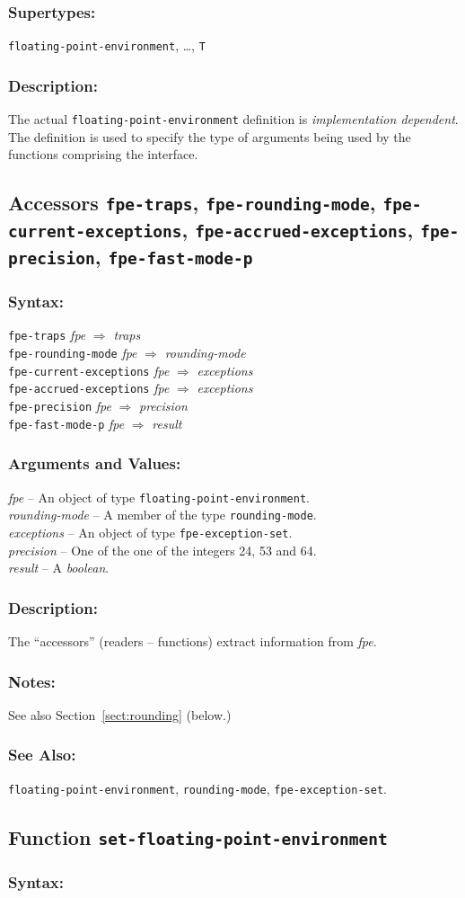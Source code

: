 \documentclass[10pt,fleqn]{article}
\newcommand{\code}[1]{\texttt{#1}}
\newcommand{\varname}[1]{\textit{#1}}
\newcommand{\DDictionaryItem}[1]{\vspace*{6pt}\noindent\hrulefill\vspace*{-9pt}\subsection*{#1}}
\newcommand{\DSyntax}{\subsubsection*{Syntax:}}
\newcommand{\DSupertypes}{\subsubsection*{Supertypes:}}
\newcommand{\DArgsNValues}{\subsubsection*{Arguments and Values:}}
\newcommand{\DDescription}{\subsubsection*{Description:}}
\newcommand{\DNotes}{\subsubsection*{Notes:}}
\newcommand{\DSeeAlso}{\subsubsection*{See Also:}}
\begin{document}
\DSupertypes{}

\code{floating-point-environment}, \ldots, \code{T}

\DDescription{}

The actual \code{floating-point-environment} definition is
\emph{implementation dependent}.  The definition is used to specify
the type of arguments being used by the functions comprising the
interface.


\DDictionaryItem{Accessors \code{fpe-traps}, \code{fpe-rounding-mode},
  \code{fpe-current-exceptions}, \code{fpe-accrued-exceptions},
  \code{fpe-precision}, \code{fpe-fast-mode-p}}

\DSyntax{}

\code{fpe-traps} \varname{fpe} $\Rightarrow$ \varname{traps}\\
\code{fpe-rounding-mode} \varname{fpe} $\Rightarrow$ \varname{rounding-mode}\\
\code{fpe-current-exceptions} \varname{fpe} $\Rightarrow$ \varname{exceptions}\\
\code{fpe-accrued-exceptions} \varname{fpe} $\Rightarrow$ \varname{exceptions}\\
\code{fpe-precision} \varname{fpe} $\Rightarrow$ \varname{precision}\\
\code{fpe-fast-mode-p} \varname{fpe} $\Rightarrow$ \varname{result}

\DArgsNValues{}

\varname{fpe} -- An object of type \code{floating-point-environment}.\\
\varname{rounding-mode} -- A member of the type \code{rounding-mode}.\\
\varname{exceptions} -- An object of type \code{fpe-exception-set}.\\
\varname{precision} -- One of the one of the integers 24, 53 and 64.\\
\varname{result} -- A \emph{boolean}.

\DDescription{}

The ``accessors'' (readers -- functions) extract information from
\varname{fpe}.


\DNotes{}

See also Section~\ref{sect:rounding} (below.)

\DSeeAlso{}

\code{floating-point-environment}, \code{rounding-mode},
\code{fpe-exception-set}. 


\DDictionaryItem{Function \code{set-floating-point-environment}}

\DSyntax{}
\end{document}
